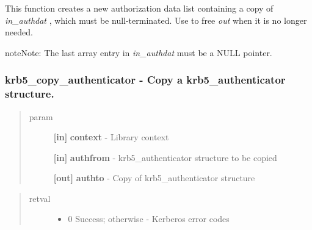 \documentclass[letterpaper,10pt,english]{sphinxmanual}
\begin{document}
This function creates a new authorization data list containing a copy of \emph{in\_authdat} , which must be null-terminated. Use {\hyperref[appdev/refs/api/krb5_free_authdata:c.krb5_free_authdata]{}} to free \emph{out} when it is no longer needed.

\begin{notice}{note}{Note:}
The last array entry in \emph{in\_authdat} must be a NULL pointer.
\end{notice}


\subsubsection{krb5\_copy\_authenticator -  Copy a krb5\_authenticator structure.}
\label{appdev/refs/api/krb5_copy_authenticator:krb5-copy-authenticator-copy-a-krb5-authenticator-structure}\label{appdev/refs/api/krb5_copy_authenticator::doc}

\begin{fulllineitems}
\label{appdev/refs/api/krb5_copy_authenticator:c.krb5_copy_authenticator}
\end{fulllineitems}

\begin{quote}\begin{description}
\item[{param}] \leavevmode
\textbf{{[}in{]}} \textbf{context} - Library context

\textbf{{[}in{]}} \textbf{authfrom} - krb5\_authenticator structure to be copied

\textbf{{[}out{]}} \textbf{authto} - Copy of krb5\_authenticator structure

\end{description}\end{quote}
\begin{quote}\begin{description}
\item[{retval}] \leavevmode\begin{itemize}
\item {} 
0   Success; otherwise - Kerberos error codes

\end{itemize}

\end{description}\end{quote}
\end{document}
